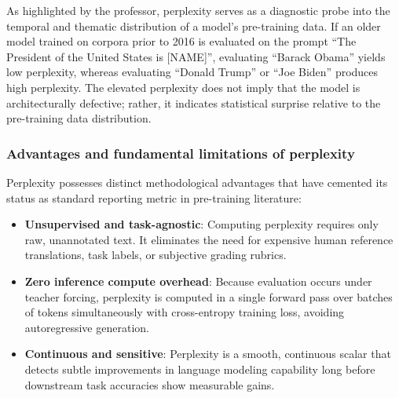 \documentclass[../../main.tex]{subfiles}
\begin{document}
As highlighted by the professor, perplexity serves as a diagnostic probe into the temporal and thematic distribution of a model's pre-training data. If an older model trained on corpora prior to 2016 is evaluated on the prompt ``The President of the United States is [NAME]'', evaluating ``Barack Obama'' yields low perplexity, whereas evaluating ``Donald Trump'' or ``Joe Biden'' produces high perplexity. The elevated perplexity does not imply that the model is architecturally defective; rather, it indicates statistical surprise relative to the pre-training data distribution.

\subsubsection{Advantages and fundamental limitations of perplexity}
Perplexity possesses distinct methodological advantages that have cemented its status as standard reporting metric in pre-training literature:
\begin{itemize}
    \item \textbf{Unsupervised and task-agnostic}: Computing perplexity requires only raw, unannotated text. It eliminates the need for expensive human reference translations, task labels, or subjective grading rubrics.
    \item \textbf{Zero inference compute overhead}: Because evaluation occurs under teacher forcing, perplexity is computed in a single forward pass over batches of tokens simultaneously with cross-entropy training loss, avoiding autoregressive generation.
    \item \textbf{Continuous and sensitive}: Perplexity is a smooth, continuous scalar that detects subtle improvements in language modeling capability long before downstream task accuracies show measurable gains.
\end{itemize}
\end{document}
